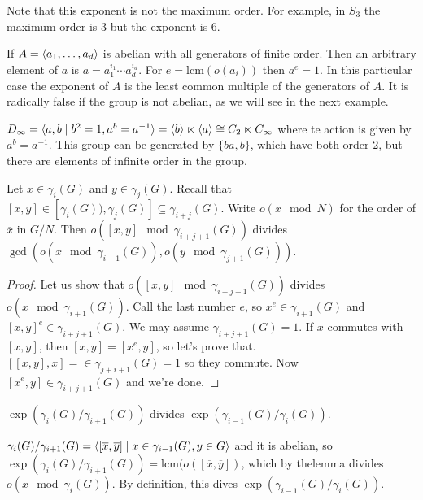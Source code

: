 \documentclass[twoside, 11pt]{article}
\begin{document}
Note that this exponent is not the maximum order. For example, in $S_3$ the maximum order is 3 but the exponent is 6.

\begin{ej}
If $A=\langle{a_1,\dots, a_d}\rangle$ is abelian with all generators of finite order. Then an arbitrary element of $a$ is $a=a_1^{i_1}\cdots a_d^{i_d}$. For $e=\mathrm{lcm}(o(a_i))$ then $a^e= 1$. In this particular case the exponent of $A$ is the least common multiple of the generators of $A$. It is radically false if the group is not abelian, as we will see in the next example.
\end{ej}

\begin{ej}
$D_\infty=\langle{a,b\mid b^2=1, a^b=a^{-1}}\rangle=\langle{b}\rangle\ltimes \langle{a}\rangle\cong C_2\ltimes C_\infty$ where te action is given by $a^b=a^{-1}$. This group can be generated by $\{ba,b\}$, which have both order 2, but there are elements of infinite order in the group. 
\end{ej}

\begin{lemma}
Let $x\in\gamma_i(G)$ and $y\in\gamma_j(G)$. Recall that $[x,y]\in[\gamma_i(G)),\gamma_j(G)]\subseteq\gamma_{i+j}(G)$. Write $o(x\mod N)$ for the order of $\overline{x}$ in $G/N$. Then $o([x,y]\mod \gamma_{i+j+1}(G))$ divides $\gcd(o(x\mod\gamma_{i+1}(G)), o(y\mod\gamma_{j+1}(G)))$. 
\end{lemma}
\begin{proof}
Let us show that $o([x,y]\mod \gamma_{i+j+1}(G))$ divides $o(x\mod \gamma_{i+1}(G))$. Call the last number $e$, so $x^e\in\gamma_{i+1}(G)$ and $[x,y]^e\in\gamma_{i+j+1}(G)$. We may assume $\gamma_{i+j+1}(G)=1$. If $x$ commutes with $[x,y]$, then $[x,y]=[x^e,y]$, so let's prove that. $[[x,y],x]=\in\gamma_{j+i+1}(G)=1$ so they commute. Now $[x^e, y]\in\gamma_{i+j+1}(G)$ and we're done.
\end{proof}

\begin{teorema}
$\exp(\gamma_i(G)/\gamma_{i+1}(G))$ divides $\exp(\gamma_{i-1}(G)/\gamma_i(G))$.
\end{teorema}
\begin{dem}
$\gamma_i(G)/\gamma_{i+1}(G)=\langle{[\overline{x},\overline{y}]\mid x\in\gamma_{i-1}(G),y\in G}\rangle$ and it is abelian, so $\exp(\gamma_i(G)/\gamma_{i+1}(G))=\mathrm{lcm}(o([\overline{x},\overline{y}])$, which by thelemma divides $o(x\mod\gamma_i(G))$. By definition, this dives $\exp(\gamma_{i-1}(G)/\gamma_i(G))$. 
\end{dem}
\end{document}
